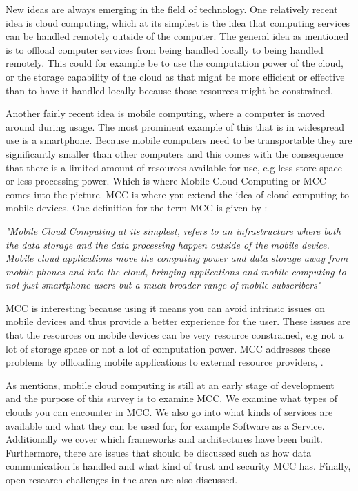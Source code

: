 New ideas are always emerging in the field of technology.
One relatively recent idea is cloud computing, which at its simplest is the idea that computing services can be handled remotely outside of the computer. 
The general idea as mentioned is to offload computer services from being handled locally to being handled remotely. 
This could for example be to use the computation power of the cloud, or the storage capability of the cloud as that might be more efficient or effective than to have it handled locally because those resources might be constrained.

Another fairly recent idea is mobile computing, where a computer is moved around during usage.
The most prominent example of this that is in widespread use is a smartphone.
Because mobile computers need to be transportable they are significantly smaller than other computers and this comes with the consequence that there is a limited amount of resources available for use, e.g less store space or less processing power.
Which is where Mobile Cloud Computing or MCC comes into the picture. 
MCC is where you extend the idea of cloud computing to mobile devices.
One definition for the term MCC is given by \citet{article:mobilecloudreviewinderkildesecurity}:

\textit{"Mobile Cloud Computing at its simplest, refers to an infrastructure where both the data storage and the data processing happen outside of the mobile device. Mobile cloud applications move the computing power and data storage away from mobile phones and into the cloud, bringing applications and mobile computing to not just smartphone users but a much broader range of mobile subscribers"}

MCC is interesting because using it means you can avoid intrinsic issues on mobile devices and thus provide a better experience for the user. 
These issues are that the resources on mobile devices can be very resource constrained, e.g not a lot of storage space or not a lot of computation power.
MCC addresses these problems by offloading mobile applications to external resource providers, \citet{fernando2013mobile}.

As \citet{6215350} mentions, mobile cloud computing is still at an early stage of development and the purpose of this survey is to examine MCC. 
We examine what types of clouds you can encounter in MCC.
We also go into what kinds of services are available and what they can be used for, for example Software as a Service.
Additionally we cover which frameworks and architectures have been built. 
Furthermore, there are issues that should be discussed such as how data communication is handled and what kind of trust and security MCC has. 
Finally, open research challenges in the area are also discussed. 
